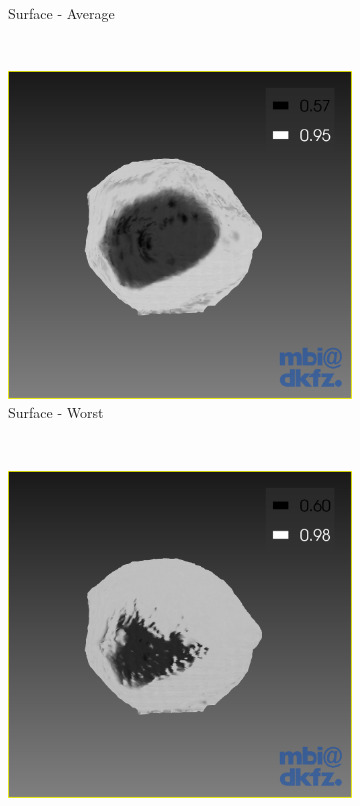 \begin{figure}[H]
\begin{subfigure}[b]{0.32\textwidth}
    \caption*{Surface - Average}
    \label{fig:surfaceaverage}
  \end{subfigure}%
  ~ %
  \begin{subfigure}[b]{0.32\textwidth}
    \includegraphics[width=\textwidth]{images/surface/surface_worst.png}
    \caption*{Surface - Worst}
    \label{fig:surfaceworst}
  \end{subfigure}%
  ~ %
  \begin{subfigure}[b]{0.32\textwidth}
    \includegraphics[width=\textwidth]{images/surface/surface_best.png}

\end{subfigure}
\end{figure}

